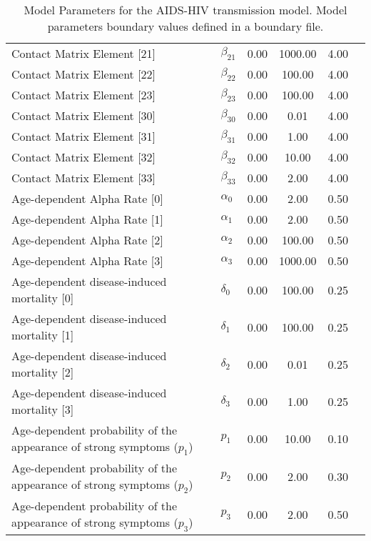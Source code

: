 \begin{table}
\begin{tabular}{p{5cm}lcccc}
Contact Matrix Element [21] & $\beta_{21}$ & 0.00 & 1000.00 & 4.00\\
Contact Matrix Element [22] & $\beta_{22}$ & 0.00 & 100.00 & 4.00\\
Contact Matrix Element [23] & $\beta_{23}$ & 0.00 & 100.00 & 4.00\\
Contact Matrix Element [30] & $\beta_{30}$ & 0.00 & 0.01 & 4.00\\
Contact Matrix Element [31] & $\beta_{31}$ & 0.00 & 1.00 & 4.00\\
Contact Matrix Element [32] & $\beta_{32}$ & 0.00 & 10.00 & 4.00\\
Contact Matrix Element [33] & $\beta_{33}$ & 0.00 & 2.00 & 4.00\\
Age-dependent Alpha Rate [0] & $\alpha_0$ & 0.00 & 2.00 & 0.50\\
Age-dependent Alpha Rate [1] & $\alpha_1$ & 0.00 & 2.00 & 0.50\\
Age-dependent Alpha Rate [2] & $\alpha_2$ & 0.00 & 100.00 & 0.50\\
Age-dependent Alpha Rate [3] & $\alpha_3$ & 0.00 & 1000.00 & 0.50\\
Age-dependent disease-induced mortality [0] & $\delta_0$ & 0.00 & 100.00 & 0.25\\
Age-dependent disease-induced mortality [1] & $\delta_1$ & 0.00 & 100.00 & 0.25\\
Age-dependent disease-induced mortality [2] & $\delta_2$ & 0.00 & 0.01 & 0.25\\
Age-dependent disease-induced mortality [3] & $\delta_3$ & 0.00 & 1.00 & 0.25\\
Age-dependent probability of the appearance of strong symptoms ($p_1$) & $p_1$ & 0.00 & 10.00 & 0.10\\
Age-dependent probability of the appearance of strong symptoms ($p_2$) & $p_2$ & 0.00 & 2.00 & 0.30\\
Age-dependent probability of the appearance of strong symptoms ($p_3$) & $p_3$ & 0.00 & 2.00 & 0.50\\
\hline\hline
\end{tabular}
\caption{Model Parameters for the AIDS-HIV transmission model. Model parameters boundary values defined in a boundary file.}
\end{table}
